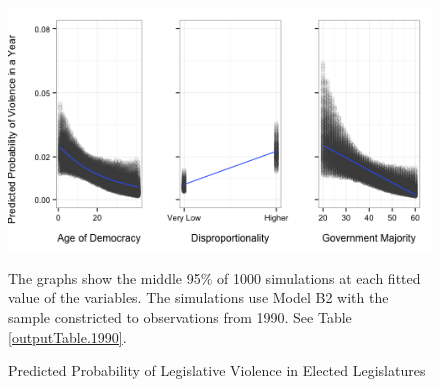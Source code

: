 \documentclass[a4paper]{article}\usepackage{graphicx, color}
\newenvironment{knitrout}{}{} %
\begin{document}
\begin{figure}[t]
    \caption{Predicted Probability of Legislative Violence in Elected Legislatures}  
    \label{pred_prob}
    \begin{center}


\begin{knitrout}
\color{fgcolor}
\includegraphics[width=0.8\linewidth]{figure/predProb} 

\end{knitrout}

    \end{center}
    \begin{singlespace}
      {\scriptsize{The graphs show the middle 95\% of 1000 simulations at each fitted value of the variables. The simulations use Model B2 with the sample constricted to observations from 1990. See Table \ref{outputTable.1990}.}}
    \end{singlespace}
\end{figure}
\end{document}

